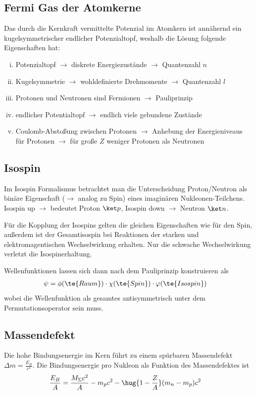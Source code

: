 \documentclass[twocolumn]{summery_4.1}
\begin{document}
\subsection{Fermi Gas der Atomkerne}
Das durch die Kernkraft vermittelte Potenzial im Atomkern ist annähernd ein kugelsymmetrischer endlicher Potenzialtopf, weshalb die Lösung folgende Eigenschaften hat:
\begin{enumerate}[(i)]
    \item Potenzialtopf \(\to\) diskrete Energiezustände \(\rightarrow \) Quantenzahl \(n\)
    \item Kugelsymmetrie \(\to\) wohldefinierte Drehmomente \(\rightarrow\) Quantenzahl \(l\)
    \item Protonen und Neutronen sind Fermionen \(\to\) Pauliprinzip
    \item endlicher Potentialtopf \(\to\) endlich viele gebundene Zustände
    \item Coulomb-Abstoßung zwischen Protonen \(\to\) Anhebung der Energieniveaus für Protonen \(\to\) für große \(Z\) weniger Protonen als Neutronen
\end{enumerate}

\subsection{Isospin}
Im Isospin Formalismus betrachtet man die Unterscheidung Proton/Neutron als binäre Eigenschaft (\(\to\) analog zu Spin) eines imaginären Nukleonen-Teilchens. Isospin up \(\to \) bedeutet Proton \(\ket p\), Isospin down \(\to \) Neutron \(\ket n\).

Für die Kopplung der Isospins gelten die gleichen Eigenschaften wie für den Spin, außerdem ist der Gesamtisospin bei Reaktionen der starken und elektromagentischen Wechselwirkung erhalten. Nur die schwache Wechselwirkung verletzt die Isospinerhaltung.

Wellenfunktionen lassen sich dann nach dem Pauliprinzip konstruieren als
\begin{align*}
    \psi &= \phi(\te{Raum}) \cdot \chi(\te{Spin}) \cdot \varphi (\te{Isospin})
\end{align*}
wobei die Wellenfunktion als gesamtes antisymmetrisch unter dem Permutationsoperator sein muss. 

\subsection{Massendefekt}
Die hohe Bindungsenergie im Kern führt zu einem spürbaren Massendefekt \(\Delta m = \frac{E_B}{c^2}\). Die Bindungsenergie pro Nukleon als Funktion des Massendefektes ist 
\begin{align*}
    \frac{E_B}{A} &= \frac{M_\Sigma c^2}{A} - m_p c^2 - \hug{1-\frac ZA} (m_n - m_p)c^2
\end{align*}
\end{document}
